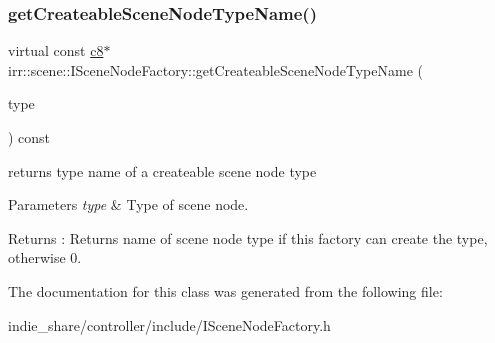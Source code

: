 \subsubsection{\texorpdfstring{get\+Createable\+Scene\+Node\+Type\+Name()}{getCreateableSceneNodeTypeName()}\hspace{0.1cm}{\footnotesize\ttfamily [2/2]}}
{\footnotesize\ttfamily virtual const \hyperlink{namespaceirr_a9395eaea339bcb546b319e9c96bf7410}{c8}$\ast$ irr\+::scene\+::\+I\+Scene\+Node\+Factory\+::get\+Createable\+Scene\+Node\+Type\+Name (\begin{DoxyParamCaption}\item[{\hyperlink{namespaceirr_1_1scene_acad3d7ef92a9807d391ba29120f3b7bd}{E\+S\+C\+E\+N\+E\+\_\+\+N\+O\+D\+E\+\_\+\+T\+Y\+PE}}]{type }\end{DoxyParamCaption}) const\hspace{0.3cm}{\ttfamily [pure virtual]}}



returns type name of a createable scene node type 


\begin{DoxyParams}{Parameters}
{\em type} & Type of scene node. \\
\hline
\end{DoxyParams}
\begin{DoxyReturn}{Returns}
\+: Returns name of scene node type if this factory can create the type, otherwise 0. 
\end{DoxyReturn}


The documentation for this class was generated from the following file\+:\begin{DoxyCompactItemize}
\item 
indie\+\_\+share/controller/include/I\+Scene\+Node\+Factory.\+h\end{DoxyCompactItemize}

